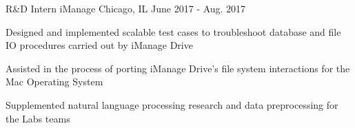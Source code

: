\begin{cventries}
  \cventry
    {R\&D Intern} %
    {iManage} %
    {Chicago, IL} %
    {June 2017 - Aug. 2017} %
    {
      \begin{cvitems} %
        \item {Designed and implemented scalable test cases to troubleshoot database and file IO procedures carried out by iManage Drive}
		\item {Assisted in the process of porting iManage Drive's file system interactions for the Mac Operating System}
		\item {Supplemented natural language processing research and data preprocessing for the Labs teams}
      \end{cvitems}
    }

 
\end{cventries}
